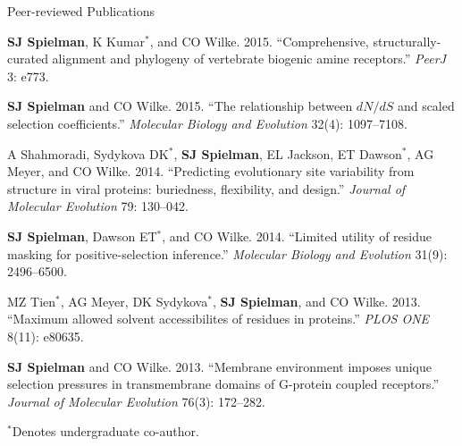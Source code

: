\documentclass{resume} %
\begin{document}
\begin{rSection}{Peer-reviewed Publications}
\begin{etaremune}[leftmargin=1.5em]
\item \textbf{SJ Spielman}, K Kumar$^\ast$, and CO Wilke. 2015. ``Comprehensive, structurally-curated alignment and phylogeny of vertebrate biogenic amine receptors.'' \emph{PeerJ} 3: e773.

\item \textbf{SJ Spielman} and CO Wilke. 2015. ``The relationship between $dN/dS$ and scaled selection coefficients.'' \emph{Molecular Biology and Evolution} 32(4): 1097--7108.

\item A Shahmoradi, Sydykova DK$^\ast$, \textbf{SJ Spielman}, EL Jackson, ET Dawson$^\ast$, AG Meyer, and CO Wilke. 2014. ``Predicting evolutionary site variability from structure in viral proteins: buriedness, flexibility, and design.'' \emph{Journal of Molecular Evolution} 79: 130--042.

\item \textbf{SJ Spielman}, Dawson ET$^\ast$, and CO Wilke. 2014. ``Limited utility of residue masking for positive-selection inference.'' \emph{Molecular Biology and Evolution} 31(9): 2496--6500.

\item MZ Tien$^\ast$, AG Meyer, DK Sydykova$^\ast$, \textbf{SJ Spielman}, and CO Wilke. 2013. ``Maximum allowed solvent accessibilites of residues in proteins.'' \emph{PLOS ONE} 8(11): e80635.

\item \textbf{SJ Spielman} and CO Wilke. 2013. ``Membrane environment imposes unique selection pressures in transmembrane domains of G-protein coupled receptors.'' \emph{Journal of Molecular Evolution} 76(3): 172--282.

\end{etaremune}

$^\ast$Denotes undergraduate co-author.
\end{rSection}
\end{document}
